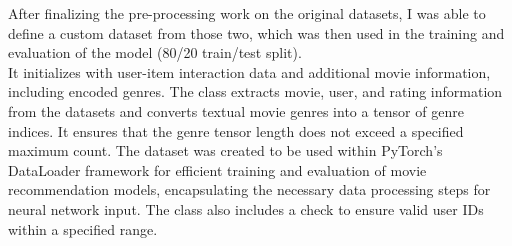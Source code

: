 \documentclass[]{article}
\begin{document}
	After finalizing the pre-processing work on the original datasets, I was able to define a custom dataset from those two, which was then used in the training and evaluation of the model (80/20 train/test split). \\
	It initializes with user-item interaction data and additional movie information, including encoded genres. The class extracts movie, user, and rating information from the datasets and converts textual movie genres into a tensor of genre indices. It ensures that the genre tensor length does not exceed a specified maximum count. The dataset was created to be used within PyTorch's DataLoader framework for efficient training and evaluation of movie recommendation models, encapsulating the necessary data processing steps for neural network input. The class also includes a check to ensure valid user IDs within a specified range. \\
	
\end{document}
